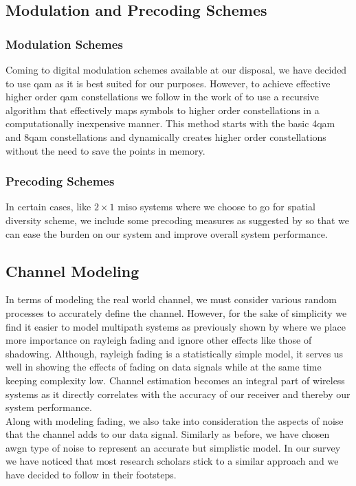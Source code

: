 \subsection{Modulation and Precoding Schemes}

\subsubsection{Modulation Schemes}
Coming to digital modulation schemes available at our disposal, we have decided to use \acrshort{qam} as it is best suited for our purposes. However, to achieve effective higher order \acrshort{qam} constellations we follow in the work of \textcite{Bellili2015} to use a recursive algorithm that effectively maps symbols to higher order constellations in a computationally inexpensive manner. This method starts with the basic 4\acrshort{qam} and 8\acrshort{qam} constellations and dynamically creates higher order constellations without the need to save the points in memory.

\subsubsection{Precoding Schemes}
In certain cases, like $2 \times 1$ \acrshort{miso} systems where we choose to go for \gls{spatial diversity} scheme, we include some precoding measures as suggested by \textcite{Alamouti1998} so that we can ease the burden on our system and improve overall system performance.

\subsection{Channel Modeling}
In terms of modeling the real world channel, we must consider various random processes to accurately define the channel. However, for the sake of simplicity we find it easier to model multipath systems as previously shown by \textcite{Hanlen2006} where we place more importance on \gls{rayleigh fading} and ignore other effects like those of shadowing. Although, \gls{rayleigh fading} is a statistically simple model, it serves us well in showing the effects of fading on data signals while at the same time keeping complexity low. Channel estimation becomes an integral part of wireless systems as it directly correlates with the accuracy of our receiver and thereby our system performance.\\
Along with modeling fading, we also take into consideration the aspects of noise that the channel adds to our data signal. Similarly as before, we have chosen \acrshort{awgn} type of noise to represent an accurate but simplistic model. In our survey we have noticed that most research scholars stick to a similar approach and we have decided to follow in their footsteps.


